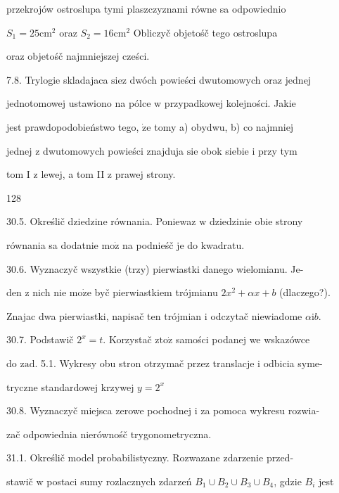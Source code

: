 \documentclass[a4paper,12pt]{article}
\begin{document}
przekrojów ostroslupa tymi plaszczyznami równe sa odpowiednio

$S_{1} = 25 \mathrm{c}\mathrm{m}^{2}$ oraz $S_{2} = 16 \mathrm{c}\mathrm{m}^{2}$ Obliczyč objetośč tego ostroslupa

oraz objetośč najmniejszej cześci.

7.8. Trylogie skladajaca $\mathrm{s}\mathrm{i}\mathrm{e} \mathrm{z}$ dwóch powieści dwutomowych oraz jednej

jednotomowej ustawiono na pólce $\mathrm{w}$ przypadkowej kolejności. Jakie

jest prawdopodobieństwo tego, $\dot{\mathrm{z}}\mathrm{e}$ tomy a) obydwu, b) co najmniej

jednej $\mathrm{z}$ dwutomowych powieści znajduja $\mathrm{s}\mathrm{i}\mathrm{e}$ obok siebie $\mathrm{i}$ przy tym

tom I $\mathrm{z}$ lewej, a tom II $\mathrm{z}$ prawej strony.





128

30.5. Określič dziedzine równania. Poniewaz $\mathrm{w}$ dziedzinie obie strony

równania sa dodatnie $\mathrm{m}\mathrm{o}\dot{\mathrm{z}}$ na podnieśč je do kwadratu.

30.6. Wyznaczyč wszystkie (trzy) pierwiastki danego wielomianu. Je-

den $\mathrm{z}$ nich nie $\mathrm{m}\mathrm{o}\dot{\mathrm{z}}\mathrm{e}$ byč pierwiastkiem trójmianu $2x^{2}+\alpha x+b$ (dlaczego?).

Znajac dwa pierwiastki, napisač ten trójmian $\mathrm{i}$ odczytač niewiadome $\alpha \mathrm{i}b.$

30.7. Podstawič $2^{x}=t$. Korzystač $\mathrm{z}\mathrm{t}\mathrm{o}\dot{\mathrm{z}}$ samości podanej we wskazówce

do $\mathrm{z}\mathrm{a}\mathrm{d}$. 5.1. Wykresy obu stron otrzymač przez translacje $\mathrm{i}$ odbicia syme-

tryczne standardowej krzywej $y=2^{x}$

30.8. Wyznaczyč miejsca zerowe pochodnej $\mathrm{i}$ za pomoca wykresu rozwia-

zač odpowiednia nierównośč trygonometryczna.

31.1. Określič model probabilistyczny. Rozwazane zdarzenie przed-

stawič $\mathrm{w}$ postaci sumy rozlacznych zdarzeń $B_{1}\cup B_{2}\cup B_{3}\cup B_{4}$, gdzie $B_{i}$ jest
\end{document}

